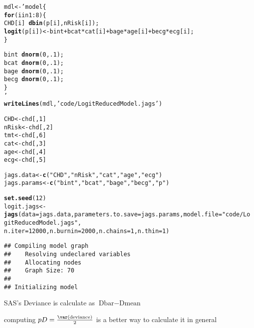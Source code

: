\documentclass[12pt,letterpaper,oneside]{article}\usepackage{graphicx, color}
\makeatletter
\newcommand{\hlfunctioncall}[1]{\textcolor[rgb]{0.501960784313725,0,0.329411764705882}{\textbf{#1}}}%
\newcommand{\hlstring}[1]{\textcolor[rgb]{0.6,0.6,1}{#1}}%
\newenvironment{kframe}{%
 \def\at@end@of@kframe{}%
 \ifinner\ifhmode%
  \def\at@end@of@kframe{\end{minipage}}%
  \begin{minipage}{\columnwidth}%
 \fi\fi%
 \def\FrameCommand##1{\hskip\@totalleftmargin \hskip-\fboxsep
 \colorbox{shadecolor}{##1}\hskip-\fboxsep
     \hskip-\linewidth \hskip-\@totalleftmargin \hskip\columnwidth}%
 \MakeFramed {\advance\hsize-\width
   \@totalleftmargin\z@ \linewidth\hsize
   \@setminipage}}%
 {\par\unskip\endMakeFramed%
 \at@end@of@kframe}
\newenvironment{knitrout}{}{} %
\makeatother
\begin{document}
\begin{knitrout}\scriptsize
{}\color{fgcolor}\begin{kframe}
\begin{alltt}
mdl <- ' model \{
    \hlfunctioncall{for} (i in 1:8) \{
        CHD[i] ~ \hlfunctioncall{dbin}(p[i], nRisk[i]);
            \hlfunctioncall{logit}(p[i]) <- bint + bcat*cat[i] + bage*age[i] + becg*ecg[i];
    \}

    bint ~ \hlfunctioncall{dnorm}(0, .1);
    bcat ~ \hlfunctioncall{dnorm}(0, .1);
    bage ~ \hlfunctioncall{dnorm}(0, .1);
    becg ~ \hlfunctioncall{dnorm}(0, .1);
\}
'
\hlfunctioncall{writeLines}(mdl,\hlstring{'code/LogitReducedModel.jags'})
\end{alltt}
\end{kframe}
\end{knitrout}

\begin{knitrout}\scriptsize
{}\color{fgcolor}\begin{kframe}
\begin{alltt}
CHD <- chd[, 1]
nRisk <- chd[, 2]
tmt <- chd[, 6]
cat <- chd[, 3]
age <- chd[, 4]
ecg <- chd[, 5]

jags.data <- \hlfunctioncall{c}(\hlstring{"CHD"}, \hlstring{"nRisk"}, \hlstring{"cat"}, \hlstring{"age"}, \hlstring{"ecg"})
jags.params <- \hlfunctioncall{c}(\hlstring{"bint"}, \hlstring{"bcat"}, \hlstring{"bage"}, \hlstring{"becg"}, \hlstring{"p"})

\hlfunctioncall{set.seed}(12)
logit.jags <- \hlfunctioncall{jags}(data = jags.data, parameters.to.save = jags.params, model.file = \hlstring{"code/LogitReducedModel.jags"}, 
    n.iter = 12000, n.burnin = 2000, n.chains = 1, n.thin = 1)
\end{alltt}


{\ttfamily\noindent\itshape\color{messagecolor}{\#\# module glm loaded}}\begin{verbatim}
## Compiling model graph
##    Resolving undeclared variables
##    Allocating nodes
##    Graph Size: 70
## 
## Initializing model
\end{verbatim}
\end{kframe}
\end{knitrout}

SAS's Deviance is calculate as $\text{Dbar}-\text{Dmean}$

computing $pD=\frac{\var(\text{deviance})}{2}$ is a better way to calculate it in general
\end{document}
